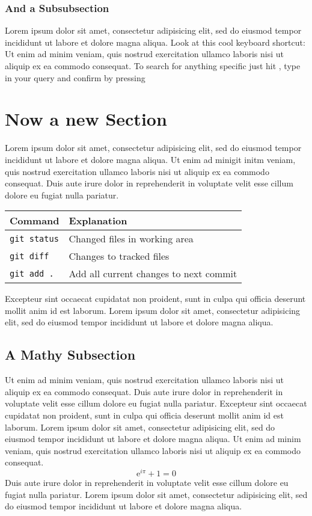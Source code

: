 \documentclass{modernCS}
\begin{document}
\subsubsection{And a Subsubsection}
Lorem ipsum dolor sit amet, consectetur adipisicing elit, sed do eiusmod
tempor incididunt ut labore et dolore magna aliqua.
Look at this cool keyboard shortcut: \keys{\ctrl + \Alt + \del}
Ut enim ad minim veniam,
quis nostrud exercitation ullamco laboris nisi ut aliquip ex ea commodo
consequat. To search for anything specific just hit , type in your query and confirm by pressing \keys{\enter}

\section{Now a new Section}
Lorem ipsum dolor sit amet, consectetur adipisicing elit, sed do eiusmod
tempor incididunt ut labore et dolore magna aliqua.
Ut enim ad minigit initm veniam,
quis nostrud exercitation ullamco laboris nisi ut aliquip ex ea commodo
consequat. Duis aute irure dolor in reprehenderit in voluptate velit esse
cillum dolore eu fugiat nulla pariatur.
\begin{center}
\begin{tabular}{ll}
\toprule
Command & Explanation \\
\midrule
\verb+git status+ & Changed files in working area \\
\verb+git diff+ & Changes to tracked files \\
\verb+git add .+ & Add all current changes to next commit \\
\bottomrule
\end{tabular}
\end{center}
Excepteur sint occaecat cupidatat non
proident, sunt in culpa qui officia deserunt mollit anim id est laborum.
Lorem ipsum dolor sit amet, consectetur adipisicing elit, sed do eiusmod
tempor incididunt ut labore et dolore magna aliqua.
\subsection{A Mathy Subsection}
Ut enim ad minim veniam,
quis nostrud exercitation ullamco laboris nisi ut aliquip ex ea commodo
consequat. Duis aute irure dolor in reprehenderit in voluptate velit esse
cillum dolore eu fugiat nulla pariatur. Excepteur sint occaecat cupidatat non
proident, sunt in culpa qui officia deserunt mollit anim id est laborum.
Lorem ipsum dolor sit amet, consectetur adipisicing elit, sed do eiusmod
tempor incididunt ut labore et dolore magna aliqua. Ut enim ad minim veniam,
quis nostrud exercitation ullamco laboris nisi ut aliquip ex ea commodo
consequat.
\[
\mathrm{e}^{i\pi} + 1 = 0
\]
Duis aute irure dolor in reprehenderit in voluptate velit esse
cillum dolore eu fugiat nulla pariatur.
Lorem ipsum dolor sit amet, consectetur adipisicing elit, sed do eiusmod
tempor incididunt ut labore et dolore magna aliqua.
\end{document}
